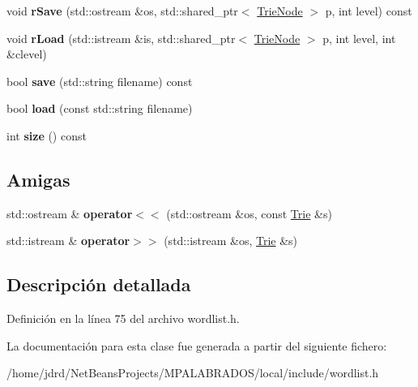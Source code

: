 \begin{DoxyCompactItemize}
\item 
\mbox{\label{classTrie_ab095672df317524d593a9b2730d33285}} 
void {\bfseries r\+Save} (std\+::ostream \&os, std\+::shared\+\_\+ptr$<$ \hyperlink{classTrieNode}{Trie\+Node} $>$ p, int level) const
\item 
\mbox{\label{classTrie_ac3a88126c73f3c62624933227c855a09}} 
void {\bfseries r\+Load} (std\+::istream \&is, std\+::shared\+\_\+ptr$<$ \hyperlink{classTrieNode}{Trie\+Node} $>$ p, int level, int \&clevel)
\item 
\mbox{\label{classTrie_aefeaac5452e2e930c330f56795b6c83e}} 
bool {\bfseries save} (std\+::string filename) const
\item 
\mbox{\label{classTrie_a24b124179d5e4ae7f84d80b21660aafb}} 
bool {\bfseries load} (const std\+::string filename)
\item 
\mbox{\label{classTrie_af1317f01af35b2b807dda69f2e37c6f1}} 
int {\bfseries size} () const
\end{DoxyCompactItemize}
\subsection*{Amigas}
\begin{DoxyCompactItemize}
\item 
\mbox{\label{classTrie_a5d7ad760deae225e8622a334a614bd27}} 
std\+::ostream \& {\bfseries operator$<$$<$} (std\+::ostream \&os, const \hyperlink{classTrie}{Trie} \&s)
\item 
\mbox{\label{classTrie_a52b5d1a4b919a0b97609d654110576c8}} 
std\+::istream \& {\bfseries operator$>$$>$} (std\+::istream \&os, \hyperlink{classTrie}{Trie} \&s)
\end{DoxyCompactItemize}


\subsection{Descripción detallada}


Definición en la línea 75 del archivo wordlist.\+h.



La documentación para esta clase fue generada a partir del siguiente fichero\+:\begin{DoxyCompactItemize}
\item 
/home/jdrd/\+Net\+Beans\+Projects/\+M\+P\+A\+L\+A\+B\+R\+A\+D\+O\+S/local/include/wordlist.\+h\end{DoxyCompactItemize}
